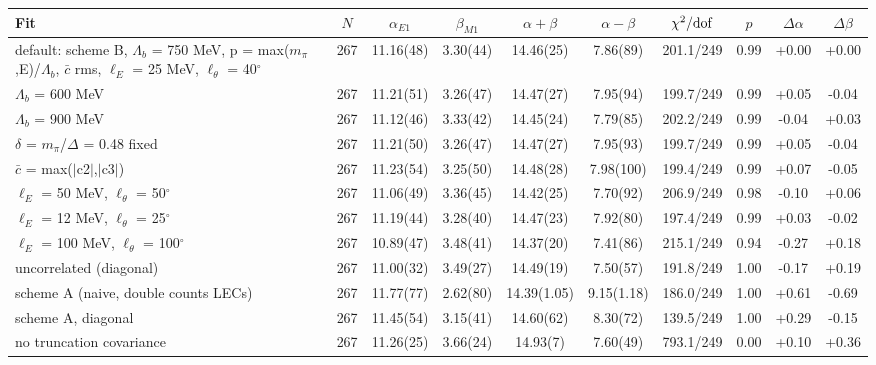 \begin{tabular}{lccccccccc}
\hline
Fit & $N$ & $\alpha_{E1}$ & $\beta_{M1}$ & $\alpha+\beta$ & $\alpha-\beta$ & $\chi^2/{\rm dof}$ & $p$ & $\Delta\alpha$ & $\Delta\beta$ \\
\hline
default: scheme B, $\Lambda_b$ = 750 MeV, p = max($m_\pi$,E)/$\Lambda_b$, $\bar c$ rms, $\ell_E$ = 25 MeV, $\ell_\theta$ = 40$^\circ$ & 267 & 11.16(48) & 3.30(44) & 14.46(25) & 7.86(89) & 201.1/249 & 0.99 & +0.00 & +0.00 \\
$\Lambda_b$ = 600 MeV & 267 & 11.21(51) & 3.26(47) & 14.47(27) & 7.95(94) & 199.7/249 & 0.99 & +0.05 & -0.04 \\
$\Lambda_b$ = 900 MeV & 267 & 11.12(46) & 3.33(42) & 14.45(24) & 7.79(85) & 202.2/249 & 0.99 & -0.04 & +0.03 \\
$\delta$ = $m_\pi$/$\Delta$ = 0.48 fixed & 267 & 11.21(50) & 3.26(47) & 14.47(27) & 7.95(93) & 199.7/249 & 0.99 & +0.05 & -0.04 \\
$\bar c$ = max($|$c2$|$,$|$c3$|$) & 267 & 11.23(54) & 3.25(50) & 14.48(28) & 7.98(100) & 199.4/249 & 0.99 & +0.07 & -0.05 \\
$\ell_E$ = 50 MeV, $\ell_\theta$ = 50$^\circ$ & 267 & 11.06(49) & 3.36(45) & 14.42(25) & 7.70(92) & 206.9/249 & 0.98 & -0.10 & +0.06 \\
$\ell_E$ = 12 MeV, $\ell_\theta$ = 25$^\circ$ & 267 & 11.19(44) & 3.28(40) & 14.47(23) & 7.92(80) & 197.4/249 & 0.99 & +0.03 & -0.02 \\
$\ell_E$ = 100 MeV, $\ell_\theta$ = 100$^\circ$ & 267 & 10.89(47) & 3.48(41) & 14.37(20) & 7.41(86) & 215.1/249 & 0.94 & -0.27 & +0.18 \\
uncorrelated (diagonal) & 267 & 11.00(32) & 3.49(27) & 14.49(19) & 7.50(57) & 191.8/249 & 1.00 & -0.17 & +0.19 \\
scheme A (naive, double counts LECs) & 267 & 11.77(77) & 2.62(80) & 14.39(1.05) & 9.15(1.18) & 186.0/249 & 1.00 & +0.61 & -0.69 \\
scheme A, diagonal & 267 & 11.45(54) & 3.15(41) & 14.60(62) & 8.30(72) & 139.5/249 & 1.00 & +0.29 & -0.15 \\
no truncation covariance & 267 & 11.26(25) & 3.66(24) & 14.93(7) & 7.60(49) & 793.1/249 & 0.00 & +0.10 & +0.36 \\
\hline
\end{tabular}


